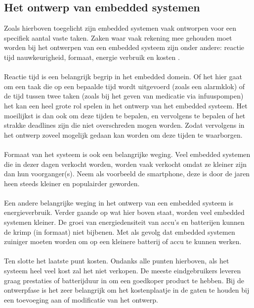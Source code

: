 \documentclass[../DCM2_Verslag.tex]{subfiles}
\begin{document}
\subsection{Het ontwerp van embedded systemen}
Zoals hierboven toegelicht zijn embedded systemen vaak ontworpen voor een specifiek aantal vaste taken. Zaken waar vaak rekening mee gehouden moet worden bij het ontwerpen van een embedded systeem zijn onder andere: reactie tijd nauwkeurigheid, formaat, energie verbruik en kosten \parencite{jacob}. 
\\\\
Reactie tijd is een belangrijk begrip in het embedded domein. Of het hier gaat om een taak die op een bepaalde tijd wordt uitgevoerd (zoals een alarmklok) of de tijd tussen twee taken (zoals bij het geven van medicatie via infuuspompen) het kan een heel grote rol spelen in het ontwerp van het embedded systeem. Het moeilijkst is dan ook om deze tijden te bepalen, en vervolgens te bepalen of het strakke deadlines zijn die niet overschreden mogen worden. Zodat vervolgens in het ontwerp zoveel mogelijk gedaan kan worden om deze tijden te waarborgen. 
\\\\
Formaat van het systeem is ook een belangrijke weging. Veel embedded systemen die in dezer dagen verkocht worden, worden vaak verkocht omdat ze kleiner zijn dan hun voorganger(s). Neem als voorbeeld de smartphone, deze is door de jaren heen steeds kleiner en populairder geworden.
\\\\
Een andere belangrijke weging in het ontwerp van een embedded systeem is energieverbruik. 
Verder gaande op wat hier boven staat, worden veel embedded systemen kleiner. De groei van energiedensiteit van accu's en batterijen kunnen de krimp (in formaat) niet bijbenen. Met als gevolg dat embedded systemen zuiniger moeten worden om op een kleinere batterij of accu te kunnen werken.
\\\\
Ten slotte het laatste punt kosten. Ondanks alle punten hierboven, als het systeem heel veel kost zal het niet verkopen. De meeste eindgebruikers leveren graag prestaties of batterijduur in om een goedkoper product te hebben. Bij de ontwerpfase is het zeer belangrijk om het kostenplaatje in de gaten te houden bij een toevoeging aan of modificatie van het ontwerp.
\end{document}
